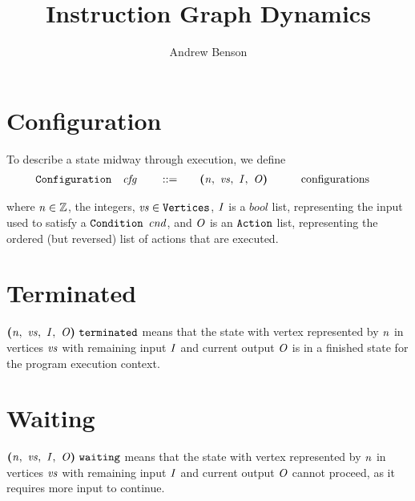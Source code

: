 \documentclass[12pt]{article}
\title{Instruction Graph Dynamics}
\author{Andrew Benson}
\date{}
\begin{document}
\maketitle

\thispagestyle{simple}
\section{Configuration}

To describe a state midway through execution, we define
\begin{alignat*}{4}
  \sort{Configuration}\quad
    &\nterm{cfg}\quad & &::=\quad &
      &\cfg{\nterm{n}}{\nterm{vs}}{\nterm{I}}{\nterm{O}}\qquad &
        &\text{configurations}
\end{alignat*}

where $\nterm{n} \in \mathbb{Z}$, the integers, $\nterm{vs} \in
\sort{Vertices}$, $\nterm{I}$ is a $bool$ list, representing the input used to
satisfy a $\sort{Condition}$ $\nterm{cnd}$, and $\nterm{O}$ is an
$\sort{Action}$ list, representing the ordered (but reversed) list of actions
that are executed.\\

\section{Terminated}

$\terminated{\cfg{\nterm{n}}{\nterm{vs}}{\nterm{I}}{\nterm{O}}}$ means that the
state with vertex represented by $\nterm{n}$ in vertices $\nterm{vs}$ with
remaining input $\nterm{I}$ and current output $\nterm{O}$ is in a finished
state for the program execution context.

\begin{mathpar}
   
\end{mathpar}

\section{Waiting}

$\waiting{\cfg{\nterm{n}}{\nterm{vs}}{\nterm{I}}{\nterm{O}}}$ means that the
state with vertex represented by $\nterm{n}$ in vertices $\nterm{vs}$ with
remaining input $\nterm{I}$ and current output $\nterm{O}$ cannot proceed, as it
requires more input to continue.

\begin{mathpar}
   

   
\end{mathpar}
\end{document}
